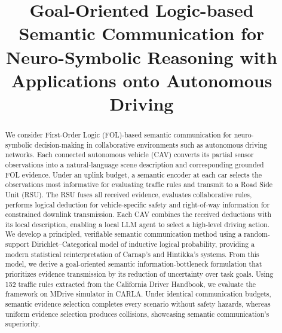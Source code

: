 \documentclass[10pt, conference, letterpaper]{ IEEEtran}
\theoremstyle{bfnote}
\begin{document}
\title{Goal-Oriented Logic-based Semantic Communication for Neuro-Symbolic Reasoning with Applications onto Autonomous Driving
}

\author{
\and
{}
\and
{}
}

\maketitle



\begin{abstract}
We consider First-Order Logic (FOL)-based semantic communication for neuro-symbolic decision-making in collaborative environments such as autonomous driving networks. Each connected autonomous vehicle (CAV) converts its partial sensor observations into a natural-language scene description and corresponding grounded FOL evidence. Under an uplink budget, a semantic encoder at each car selects the observations most informative for evaluating traffic rules and transmit to a Road Side Unit (RSU). The RSU fuses all received evidence, evaluates collaborative rules, performs logical deduction for vehicle-specific safety and right-of-way information for constrained downlink transmission. Each CAV combines the received deductions with its local description, enabling a local LLM agent to select a high-level driving action. We develop a principled, verifiable semantic communication method using a random-support Dirichlet--Categorical model of inductive logical probability, providing a modern statistical reinterpretation of Carnap's and Hintikka's systems. From this model, we derive a goal-oriented semantic information-bottleneck formulation that prioritizes evidence transmission by its reduction of uncertainty over task goals. Using 152 traffic rules extracted from the California Driver Handbook, we evaluate the framework on MDrive simulator in CARLA. Under identical communication budgets, semantic evidence selection completes every scenario without safety hazards, whereas uniform evidence selection produces collisions, showcasing semantic communication's superiority.
\end{abstract}
\end{document}
